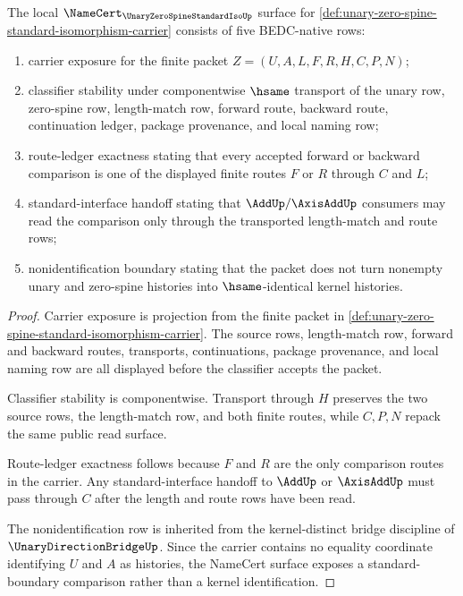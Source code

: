 \begin{theorem}
\label{thm:unary-zero-spine-standard-isomorphism-namecert-obligations}
The local $\NameCert_{\UnaryZeroSpineStandardIsoUp}$ surface for \autoref{def:unary-zero-spine-standard-isomorphism-carrier} consists of five BEDC-native rows:
\begin{enumerate}
\item carrier exposure for the finite packet $Z=(U,A,L,F,R,H,C,P,N)$;
\item classifier stability under componentwise $\hsame$ transport of the unary row, zero-spine row, length-match row, forward route, backward route, continuation ledger, package provenance, and local naming row;
\item route-ledger exactness stating that every accepted forward or backward comparison is one of the displayed finite routes $F$ or $R$ through $C$ and $L$;
\item standard-interface handoff stating that $\AddUp/\AxisAddUp$ consumers may read the comparison only through the transported length-match and route rows;
\item nonidentification boundary stating that the packet does not turn nonempty unary and zero-spine histories into $\hsame$-identical kernel histories.
\end{enumerate}
\end{theorem}
\begin{proof}
Carrier exposure is projection from the finite packet in \autoref{def:unary-zero-spine-standard-isomorphism-carrier}. The source rows, length-match row, forward and backward routes, transports, continuations, package provenance, and local naming row are all displayed before the classifier accepts the packet.

Classifier stability is componentwise. Transport through $H$ preserves the two source rows, the length-match row, and both finite routes, while $C,P,N$ repack the same public read surface.

Route-ledger exactness follows because $F$ and $R$ are the only comparison routes in the carrier. Any standard-interface handoff to $\AddUp$ or $\AxisAddUp$ must pass through $C$ after the length and route rows have been read.

The nonidentification row is inherited from the kernel-distinct bridge discipline of $\UnaryDirectionBridgeUp$. Since the carrier contains no equality coordinate identifying $U$ and $A$ as histories, the NameCert surface exposes a standard-boundary comparison rather than a kernel identification.
\end{proof}

